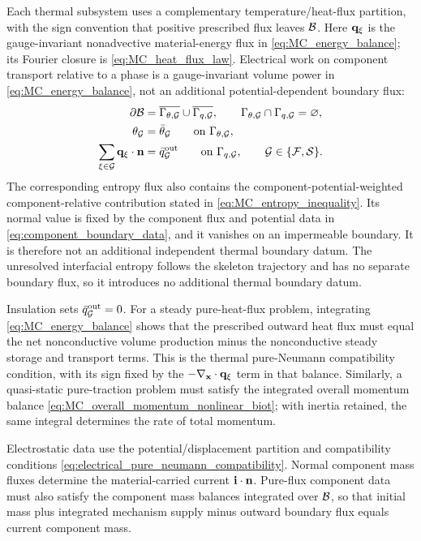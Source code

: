Each thermal subsystem uses a complementary temperature/heat-flux partition,
with the sign convention that positive prescribed flux leaves \(\mathcal{B}\).
Here \(\mathbf{q}_\xi\) is the gauge-invariant nonadvective material-energy flux in
\eqref{eq:MC_energy_balance}; its Fourier closure is
\eqref{eq:MC_heat_flux_law}.  Electrical work on component transport relative
to a phase is a gauge-invariant volume power in
\eqref{eq:MC_energy_balance}, not an additional potential-dependent boundary
flux:
%
\begin{subequations}
	\label{eq:thermal_boundary_data}
	\begin{align}
		\partial\mathcal{B}
		 & =
		\overline{\Gamma_{\theta,\mathcal{G}}}
		\cup
		\overline{\Gamma_{q,\mathcal{G}}},
		\qquad
		\Gamma_{\theta,\mathcal{G}}
		\cap
		\Gamma_{q,\mathcal{G}}
		=\varnothing,
		\label{eq:thermal_boundary_partition} \\
		\theta_{\mathcal{G}}
		 & =
		\bar\theta_{\mathcal{G}}
		\qquad
		\text{on }\Gamma_{\theta,\mathcal{G}},
		\label{eq:temperature_boundary_data} \\
		\sum_{\xi\in\mathcal{G}}
		\mathbf{q}_\xi\cdot\mathbf{n}
		 & =
		\bar q_{\mathcal{G}}^{\rm out}
		\qquad
		\text{on }\Gamma_{q,\mathcal{G}},
		\qquad
		\mathcal{G}\in\{\mathcal{F},\mathcal{S}\}.
		\label{eq:heat_flux_boundary_data}
	\end{align}
\end{subequations}
%
The corresponding entropy flux also contains the
component-potential-weighted component-relative contribution stated in
\eqref{eq:MC_entropy_inequality}.  Its normal value is fixed by the component
flux and potential data in \eqref{eq:component_boundary_data}, and it vanishes
on an impermeable boundary.  It is therefore not an additional independent
thermal boundary datum.
The unresolved interfacial entropy follows the skeleton trajectory and has no
separate boundary flux, so it introduces no additional thermal boundary datum.

Insulation sets \(\bar q_{\mathcal{G}}^{\rm out}=0\).  For a steady pure-heat-flux
problem, integrating \eqref{eq:MC_energy_balance} shows that the prescribed
outward heat flux must equal the net nonconductive volume production minus the
nonconductive steady storage and transport terms.  This is the thermal
pure-Neumann compatibility condition, with its sign fixed by the
\(-\nabla_{\mathbf{x}}\cdot\mathbf{q}_\xi\) term in that balance.  Similarly, a
quasi-static pure-traction problem must satisfy the integrated overall momentum
balance \eqref{eq:MC_overall_momentum_nonlinear_biot}; with inertia retained,
the same integral determines the rate of total momentum.

Electrostatic data use the potential/displacement partition and compatibility
conditions \eqref{eq:electrical_pure_neumann_compatibility}.  Normal component
mass fluxes determine the material-carried current
\(\mathbf{i}\cdot\mathbf{n}\).  Pure-flux component data must also satisfy the component
mass balances integrated over \(\mathcal{B}\), so that initial mass plus integrated
mechanism supply minus outward boundary flux equals current component mass.
